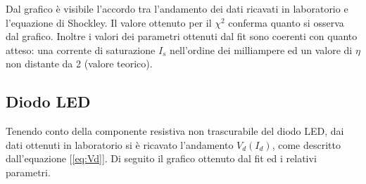 \documentclass[9pt,a4paper,twocolumn,twoside]{tau-class/tau}
\begin{document}
Dal grafico è visibile l'accordo tra l'andamento dei dati ricavati in laboratorio e l'equazione di Shockley. Il valore ottenuto per il $\chi^2$ conferma quanto si osserva dal grafico. Inoltre i valori dei parametri ottenuti dal fit sono coerenti con quanto atteso: una corrente di saturazione $I_s$ nell'ordine dei milliampere ed un valore di $\eta$ non distante da 2 (valore teorico). 

\subsection{Diodo LED}
Tenendo conto della componente resistiva non trascurabile del diodo LED, dai dati ottenuti in laboratorio si è ricavato l'andamento $V_d(I_d)$, come descritto dall'equazione [\ref{eq:Vd}].  Di seguito il grafico ottenuto dal fit ed i relativi parametri.
\end{document}
